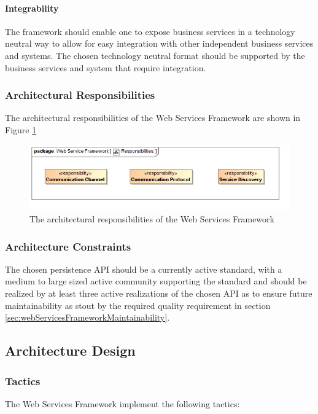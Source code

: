\paragraph{Integrability}
The framework should enable one to expose business services in a technology
neutral way to allow for easy integration with other independent business
services and systems.  The chosen technology neutral format should be supported
by the business services and system that require integration.

\subsubsection{Architectural Responsibilities}
The architectural responsibilities of the Web Services Framework are shown in 
Figure \ref{fig:webServicesFrameworkResponsibilities}
\begin{figure}[H]
	\begin{center}
	\includegraphics[scale=0.5]{../Diagrams and Charts/Web Services Framework/Responsibilities.jpg}
	\caption{The architectural responsibilities of the Web Services Framework}
	\label{fig:webServicesFrameworkResponsibilities}
	\end{center}
\end{figure}

\subsubsection{Architecture Constraints}
The chosen persistence API should be a currently active standard, with a medium
to large sized active community supporting the standard and should be realized
by at least three active realizations of the chosen API as to ensure future 
maintainability as stout by the required quality requirement in 
section \ref{sec:webServicesFrameworkMaintainability}.

\subsection{Architecture Design}
\subsubsection{Tactics}
The Web Services Framework implement the following tactics:
